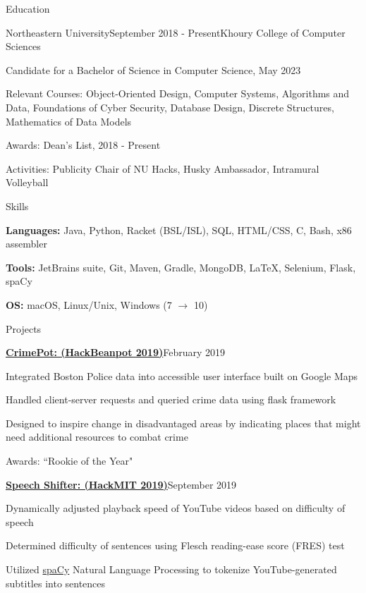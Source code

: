 \documentclass{resume}
\begin{document}
\begin{rSection}{Education}
\begin{rSubsection}{Northeastern University}{September 2018 - Present}{Khoury College of Computer Sciences}{}
\item Candidate for a Bachelor of Science in Computer Science, May 2023
\item Relevant Courses: Object-Oriented Design, Computer Systems, Algorithms and Data, Foundations of Cyber Security, Database Design, Discrete Structures, Mathematics of Data Models
\item Awards: Dean's List, 2018 - Present
\item Activities: Publicity Chair of NU Hacks, Husky Ambassador, Intramural Volleyball
\end{rSubsection}

\end{rSection}

\begin{rSection}{Skills}
  \begin{list}{\tiny\raisebox{1ex}{\textbullet}}{\leftmargin=2.0em}
    \item {\bf Languages:} Java, Python, Racket (BSL/ISL), SQL, HTML/CSS, C, Bash, x86 assembler 
    \item {\bf Tools:} JetBrains suite, Git, Maven, Gradle, MongoDB, \LaTeX{}, Selenium, Flask, spaCy
    \item {\bf OS:} macOS, Linux/Unix, Windows (7 $\to$ 10)
  \end{list}
\end{rSection}
\begin{rSection}{Projects}

\begin{rSubsection}{\href{https://www.devpost.com/software/CrimePot}{{\bf CrimePot: (HackBeanpot 2019)}}}{February 2019}{}{}
\item Integrated Boston Police data into accessible user interface built on Google Maps
\item Handled client-server requests and queried crime data using flask framework
\item Designed to inspire change in disadvantaged areas by indicating places that might need additional resources to combat crime
\item Awards: ``Rookie of the Year" 
\end{rSubsection}

\begin{rSubsection}{\href{https://www.devpost.com/software/SpeechShifter}{\bf Speech Shifter: (HackMIT 2019)}}{September 2019}{}{}
\item Dynamically adjusted playback speed of YouTube videos based on difficulty of speech
\item Determined difficulty of sentences using Flesch reading-ease score (FRES) test
\item Utilized \href{https://www.spacy.io}{spaCy} Natural Language Processing to tokenize YouTube-generated subtitles into sentences
\end{rSubsection}

\end{rSection}
\end{document}
